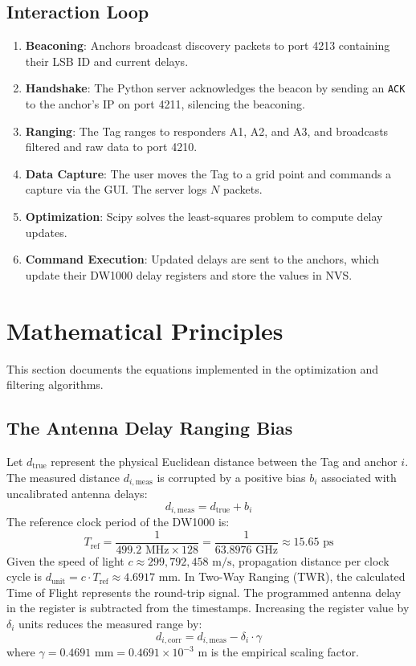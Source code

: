 \documentclass[11pt,a4paper]{article}
\begin{document}
\subsection{Interaction Loop}
\begin{enumerate}
    \item \textbf{Beaconing}: Anchors broadcast discovery packets to port 4213 containing their LSB ID and current delays.
    \item \textbf{Handshake}: The Python server acknowledges the beacon by sending an \texttt{ACK} to the anchor's IP on port 4211, silencing the beaconing.
    \item \textbf{Ranging}: The Tag ranges to responders A1, A2, and A3, and broadcasts filtered and raw data to port 4210.
    \item \textbf{Data Capture}: The user moves the Tag to a grid point and commands a capture via the GUI. The server logs $N$ packets.
    \item \textbf{Optimization}: Scipy solves the least-squares problem to compute delay updates.
    \item \textbf{Command Execution}: Updated delays are sent to the anchors, which update their DW1000 delay registers and store the values in NVS.
\end{enumerate}

\newpage
\section{Mathematical Principles}
This section documents the equations implemented in the optimization and filtering algorithms.

\subsection{The Antenna Delay Ranging Bias}
Let $d_{\text{true}}$ represent the physical Euclidean distance between the Tag and anchor $i$. The measured distance $d_{i,\text{meas}}$ is corrupted by a positive bias $b_i$ associated with uncalibrated antenna delays:
\begin{equation}
    d_{i,\text{meas}} = d_{\text{true}} + b_i
\end{equation}
The reference clock period of the DW1000 is:
\begin{equation}
    T_{\text{ref}} = \frac{1}{499.2 \text{ MHz} \times 128} = \frac{1}{63.8976 \text{ GHz}} \approx 15.65 \text{ ps}
\end{equation}
Given the speed of light $c \approx 299,792,458 \text{ m/s}$, propagation distance per clock cycle is $d_{\text{unit}} = c \cdot T_{\text{ref}} \approx 4.6917 \text{ mm}$. 
In Two-Way Ranging (TWR), the calculated Time of Flight represents the round-trip signal. The programmed antenna delay in the register is subtracted from the timestamps. Increasing the register value by $\delta_i$ units reduces the measured range by:
\begin{equation}
    d_{i,\text{corr}} = d_{i,\text{meas}} - \delta_i \cdot \gamma
\end{equation}
where $\gamma = 0.4691 \text{ mm} = 0.4691 \times 10^{-3} \text{ m}$ is the empirical scaling factor.
\end{document}
